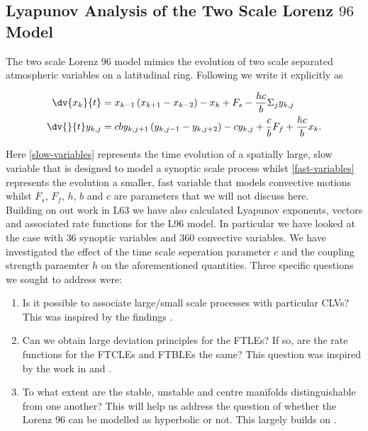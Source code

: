 \subsection{Lyapunov Analysis of the Two Scale Lorenz $96$ Model} \label{subsection: L96 Results}

The two scale Lorenz 96 model mimics the evolution of two scale separated atmospheric variables on a latitudinal ring. Following \cite{Carlu2019} we write it explicitly as

\begin{align}
\dv{x_k}{t} &= x_{k-1} \left(x_{k+1} - x_{k-2} \right) -x_k + F_s - \frac{hc}{b} \Sigma_{j} y_{k, j} \label{slow-variables}\\
\dv{}{t} y_{k,j} &= cb y_{k, j+1} \left(y_{k, j-1} - y_{k, j + 2} \right) - c y_{k, j} + \frac{c}{b} F_f + \frac{hc}{b} x_k. \label{fast-variables}
\end{align}

Here \ref{slow-variables} represents the time evolution of a spatially large, slow variable that is designed to model a synoptic scale process whilst \ref{fast-variables} represents the evolution a smaller, fast variable that models convective motions whilst $F_s$, $F_f$, $h$, $b$ and $c$ are parameters that we will not discuss here. \\

Building on out work in L63 we have also calculated Lyapunov exponents, vectors and associated rate functions for the L96 model. In particular we have looked at the case with $36$ synoptic variables and $360$ convective variables. We have investigated the effect of the time scale seperation parameter $c$ and the coupling strength paraemter $h$ on the aforementioned quantities. Three specific questions we sought to address were:

\begin{enumerate}
    \item Is it possible to associate large/small scale processes with particular CLVs? This was inspired by the findings \cite{Vannitsem2016}. \label{question: scale}
    \item Can we obtain large deviation principles for the FTLEs? If so, are the rate functions for the FTCLEs and FTBLEs the same? This question was inspired by the work in \cite{Vannitsem2016} and \cite{DeCruz2018}. \label{question: l96-LDP}
    \item To what extent are the stable, unstable and centre manifolds distinguishable from one another? This will help us address the question of whether the Lorenz $96$ can be modelled as hyperbolic or not. This largely builds on \cite{Carlu2019} \label{question: L96-hyperbolic}.
\end{enumerate}


